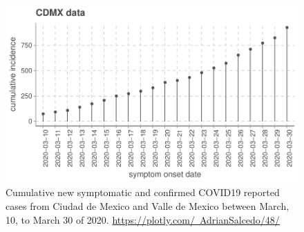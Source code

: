 \begin{figure}[htb]
    \centering
    \includegraphics[scale=0.8, keepaspectratio]{Figures/cdmx_input_data}
    \caption{%
        Cumulative new symptomatic and confirmed COVID19 reported cases from
        Ciudad de Mexico and Valle de Mexico
        \cite{cdmxDATA} between March, 10, to March 30 of
        2020.
        \href{https://plotly.com/~AdrianSalcedo/48/}{%
		https://plotly.com/~AdrianSalcedo/48/}
	}
    \label{fig:data_CDMX}
\end{figure}
%
